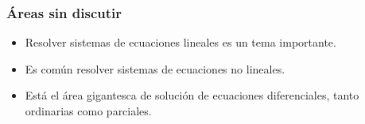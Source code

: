 \documentclass[english, spanish, fleqn,%
hyperref = {colorlinks, urlcolor = blue}%
]{beamer}
\begin{document}
\begin{frame}
  \setcounter{beamerpauses}{2}
  \frametitle{Áreas sin discutir}
  \begin{itemize}
   \item
     Resolver sistemas de ecuaciones lineales es un tema importante.
   \item
     Es común resolver sistemas de ecuaciones no lineales.
   \item
     Está el área gigantesca de solución de ecuaciones diferenciales,
     tanto ordinarias como parciales.
  \end{itemize}
\end{frame}




\end{document}
